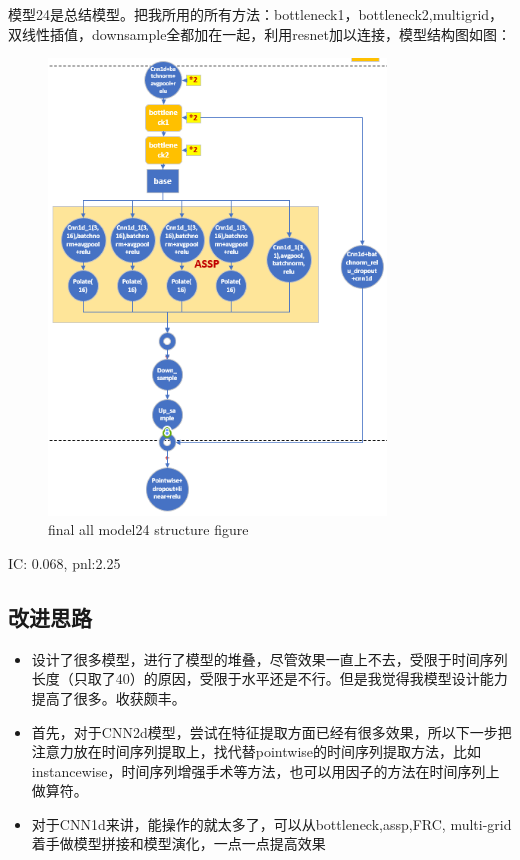 \documentclass[11pt]{ctexart}
\begin{document}
模型24是总结模型。把我所用的所有方法：bottleneck1，bottleneck2,multigrid，双线性插值，downsample全都加在一起，利用resnet加以连接，模型结构图如图：
\begin{figure}[H]
\begin{center}
\includegraphics[width=0.8\textwidth]{str14.PNG}
\end{center}
\caption{final all model24 structure figure}
\label{FIG.15}
\end{figure}

{\kaishu \small IC: 0.068, pnl:2.25}

\subsection{改进思路}
\begin{itemize}
  \item [0)]
  设计了很多模型，进行了模型的堆叠，尽管效果一直上不去，受限于时间序列长度（只取了40）的原因，受限于水平还是不行。但是我觉得我模型设计能力提高了很多。收获颇丰。
  \item [1)]
  首先，对于CNN2d模型，尝试在特征提取方面已经有很多效果，所以下一步把注意力放在时间序列提取上，找代替pointwise的时间序列提取方法，比如instancewise，时间序列增强手术等方法，也可以用因子的方法在时间序列上做算符。
  \item [2)]
  对于CNN1d来讲，能操作的就太多了，可以从bottleneck,assp,FRC, multi-grid着手做模型拼接和模型演化，一点一点提高效果
\end{itemize}
\end{document}
